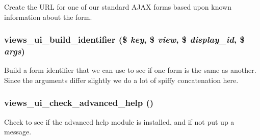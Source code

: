 \label{admin_8inc_a89ecd86607b4c1d1928120aaa1004c0d}
Create the URL for one of our standard AJAX forms based upon known information about the form. \hypertarget{admin_8inc_a70be38405376cc28c9f3c53643ae8581}{
\subsubsection[{views\_\-ui\_\-build\_\-identifier}]{\setlength{\rightskip}{0pt plus 5cm}views\_\-ui\_\-build\_\-identifier (\$ {\em key}, \/  \$ {\em view}, \/  \$ {\em display\_\-id}, \/  \$ {\em args})}}
\label{admin_8inc_a70be38405376cc28c9f3c53643ae8581}
Build a form identifier that we can use to see if one form is the same as another. Since the arguments differ slightly we do a lot of spiffy concatenation here. \hypertarget{admin_8inc_adef4f03f528e350d8153839789f69335}{
\subsubsection[{views\_\-ui\_\-check\_\-advanced\_\-help}]{\setlength{\rightskip}{0pt plus 5cm}views\_\-ui\_\-check\_\-advanced\_\-help ()}}
\label{admin_8inc_adef4f03f528e350d8153839789f69335}
Check to see if the advanced help module is installed, and if not put up a message.

